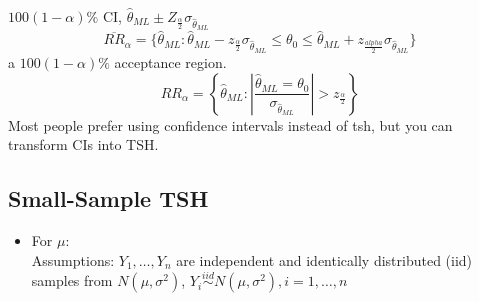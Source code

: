 \documentclass[12 pt]{article}
\begin{document}
  $100(1-\alpha)\%$ CI, $\hat{\theta}_{ML} \pm Z_{\frac{\alpha}{2}}
  \sigma_{\hat{\theta}_{ML}}$
  $$\overline{RR}_\alpha = \{\hat{\theta}_{ML} : \hat{\theta}_{ML} -
  z_{\frac{\alpha}{2}}\sigma_{\hat{\theta}_{ML}} \leq \theta_0 \leq
  \hat{\theta}_{ML}+z_{\frac{alpha}{2}}\sigma_{\hat{\theta}_{ML}}\}$$
  a $100(1-\alpha)\%$ acceptance region.
  $$RR_{\alpha} = \left\{\hat{\theta}_{ML}:
    \left|\frac{\hat{\theta}_{ML}=\theta_0}{\sigma_{\hat{\theta}_{ML}}}\right|
    > z_{\frac{\alpha}{2}}\right\}$$
  Most people prefer using confidence intervals instead of tsh, but
  you can transform CIs into TSH.
  \subsection{Small-Sample TSH}
  \begin{itemize}
  \item For $\mu$:
    \\ Assumptions: $Y_1, \ldots, Y_n$ are independent and identically
    distributed (iid) samples from $N(\mu,\sigma^2)$, $Y_i
    \stackrel{iid}{\sim}N(\mu,\sigma^2), i=1,\ldots,n$


\end{itemize}
\end{document}
